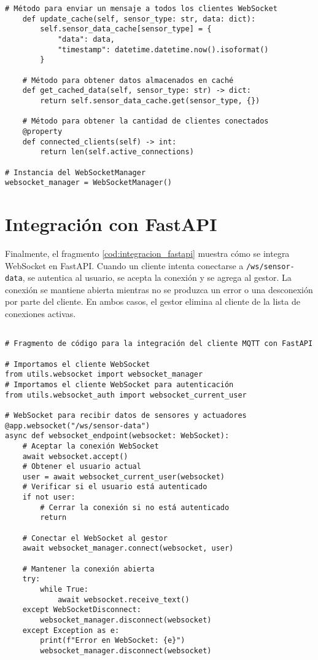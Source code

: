 \begin{lstlisting}[label=cod:web_socket,caption=Definición de clase WebSocket. , language=PythonUTF8]
    # Método para enviar un mensaje a todos los clientes WebSocket
    def update_cache(self, sensor_type: str, data: dict):
        self.sensor_data_cache[sensor_type] = {
            "data": data,
            "timestamp": datetime.datetime.now().isoformat()
        }
        
    # Método para obtener datos almacenados en caché
    def get_cached_data(self, sensor_type: str) -> dict:
        return self.sensor_data_cache.get(sensor_type, {})
        
    # Método para obtener la cantidad de clientes conectados
    @property
    def connected_clients(self) -> int:
        return len(self.active_connections)
    
# Instancia del WebSocketManager
websocket_manager = WebSocketManager()
\end{lstlisting}

\section{Integración con FastAPI}

Finalmente, el fragmento \ref{cod:integracion_fastapi} muestra cómo se integra
WebSocket en FastAPI. Cuando un cliente intenta conectarse a
\texttt{/ws/sensor-data}, se autentica al usuario, se acepta la conexión y se
agrega al gestor. La conexión se mantiene abierta mientras no se produzca un
error o una desconexión por parte del cliente. En ambos casos, el gestor
elimina al cliente de la lista de conexiones activas.

\begin{lstlisting}[label=cod:integracion_fastapi,caption=Cliente WebSocket en FastAPI., language=PythonUTF8]

# Fragmento de código para la integración del cliente MQTT con FastAPI

# Importamos el cliente WebSocket
from utils.websocket import websocket_manager
# Importamos el cliente WebSocket para autenticación
from utils.websocket_auth import websocket_current_user

# WebSocket para recibir datos de sensores y actuadores
@app.websocket("/ws/sensor-data")
async def websocket_endpoint(websocket: WebSocket):
    # Aceptar la conexión WebSocket
    await websocket.accept()
    # Obtener el usuario actual
    user = await websocket_current_user(websocket)
    # Verificar si el usuario está autenticado
    if not user:
        # Cerrar la conexión si no está autenticado
        return
    
    # Conectar el WebSocket al gestor
    await websocket_manager.connect(websocket, user)
    
    # Mantener la conexión abierta
    try:
        while True:
            await websocket.receive_text()
    except WebSocketDisconnect:
        websocket_manager.disconnect(websocket)
    except Exception as e:
        print(f"Error en WebSocket: {e}")
        websocket_manager.disconnect(websocket)
\end{lstlisting}

